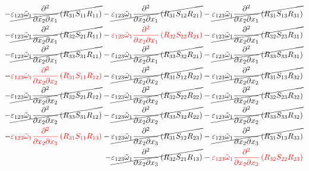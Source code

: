 \begin{equation}
	\begin{split}
		-\cancel{\varepsilon_{123}\tilde{\omega}_{1}\pdv{}{x_{2}}{x_{1}}\left(R_{31}S_{11}R_{11}\right)}
		-\cancel{\varepsilon_{123}\tilde{\omega}_{1}\pdv{}{x_{2}}{x_{1}}\left(R_{31}S_{12}R_{21}\right)}
		-\cancel{\varepsilon_{123}\tilde{\omega}_{1}\pdv{}{x_{2}}{x_{1}}\left(R_{31}S_{13}R_{31}\right)}\\
		-\cancel{\varepsilon_{123}\tilde{\omega}_{1}\pdv{}{x_{2}}{x_{1}}\left(R_{32}S_{21}R_{11}\right)}
		-{\color{red}\varepsilon_{123}\tilde{\omega}_{1}\pdv{}{x_{2}}{x_{1}}\left(R_{32}S_{22}R_{21}\right)}
		-\cancel{\varepsilon_{123}\tilde{\omega}_{1}\pdv{}{x_{2}}{x_{1}}\left(R_{32}S_{23}R_{31}\right)}\\
		-\cancel{\varepsilon_{123}\tilde{\omega}_{1}\pdv{}{x_{2}}{x_{1}}\left(R_{33}S_{31}R_{11}\right)}
		-\cancel{\varepsilon_{123}\tilde{\omega}_{1}\pdv{}{x_{2}}{x_{1}}\left(R_{33}S_{32}R_{21}\right)}
		-\cancel{\varepsilon_{123}\tilde{\omega}_{1}\pdv{}{x_{2}}{x_{1}}\left(R_{33}S_{33}R_{31}\right)}\\
		-{\color{red}\varepsilon_{123}\tilde{\omega}_{1}\pdv{}{x_{2}}{x_{2}}\left(R_{31}S_{11}R_{12}\right)}
		-\cancel{\varepsilon_{123}\tilde{\omega}_{1}\pdv{}{x_{2}}{x_{2}}\left(R_{31}S_{12}R_{22}\right)}
		-\cancel{\varepsilon_{123}\tilde{\omega}_{1}\pdv{}{x_{2}}{x_{2}}\left(R_{31}S_{13}R_{32}\right)}\\
		-\cancel{\varepsilon_{123}\tilde{\omega}_{1}\pdv{}{x_{2}}{x_{2}}\left(R_{32}S_{21}R_{12}\right)}
		-\cancel{\varepsilon_{123}\tilde{\omega}_{1}\pdv{}{x_{2}}{x_{2}}\left(R_{32}S_{22}R_{22}\right)}
		-\cancel{\varepsilon_{123}\tilde{\omega}_{1}\pdv{}{x_{2}}{x_{2}}\left(R_{32}S_{23}R_{32}\right)}\\
		-\cancel{\varepsilon_{123}\tilde{\omega}_{1}\pdv{}{x_{2}}{x_{2}}\left(R_{33}S_{31}R_{12}\right)}
		-\cancel{\varepsilon_{123}\tilde{\omega}_{1}\pdv{}{x_{2}}{x_{2}}\left(R_{33}S_{32}R_{22}\right)}
		-\cancel{\varepsilon_{123}\tilde{\omega}_{1}\pdv{}{x_{2}}{x_{2}}\left(R_{33}S_{33}R_{32}\right)}\\
		-{\color{red}\varepsilon_{123}\tilde{\omega}_{1}\pdv{}{x_{2}}{x_{3}}\left(R_{31}S_{11}R_{13}\right)}
		-\cancel{\varepsilon_{123}\tilde{\omega}_{1}\pdv{}{x_{2}}{x_{3}}\left(R_{31}S_{12}R_{23}\right)}
		-\cancel{\varepsilon_{123}\tilde{\omega}_{1}\pdv{}{x_{2}}{x_{3}}\left(R_{31}S_{13}R_{33}\right)}\\
		-\cancel{\varepsilon_{123}\tilde{\omega}_{1}\pdv{}{x_{2}}{x_{3}}\left(R_{32}S_{21}R_{13}\right)}
		-{\color{red}\varepsilon_{123}\tilde{\omega}_{1}\pdv{}{x_{2}}{x_{3}}\left(R_{32}S_{22}R_{23}\right)}

\end{split}
\end{equation}
